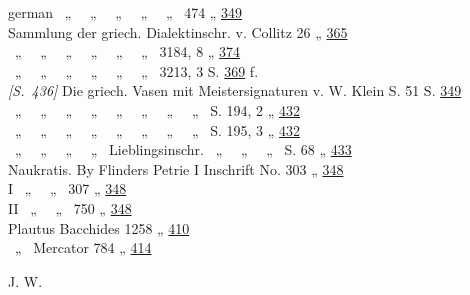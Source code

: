 \begin{otherlanguage*}{german}
\phantom{a}~„~ ~„~ ~„~ ~„~ ~„~ 474 \dotfill „ \hyperlink{p349}{349}\\
Sammlung der griech. Dialektinschr. v. Collitz 26 \dotfill „ \hyperlink{p365}{365}\\
\phantom{a}~„~ ~„~ ~„~ ~„~ ~„~ ~„~ 3184, 8 \dotfill „ \hyperlink{p374}{374}\\
\phantom{a}~„~ ~„~ ~„~ ~„~ ~„~ ~„~ 3213, 3 \dotfill S. \hyperlink{p369}{369} f.\\
\hypertarget{p436}{\emph{[S.~436]}}\label{p436} Die griech. Vasen mit Meistersignaturen v. W. Klein S. 51 \dotfill S. \hyperlink{p349}{349}\\
\phantom{a}~„~ ~„~ ~„~ ~„~ ~„~ ~„~ ~„~ ~„~ S. 194, 2 \dotfill „ \hyperlink{p432}{432}\\
\phantom{a}~„~ ~„~ ~„~ ~„~ ~„~ ~„~ ~„~ ~„~ S. 195, 3 \dotfill „ \hyperlink{p432}{432}\\
\phantom{a}~„~ ~„~ ~„~ ~„~ Lieblingsinschr. ~„~ ~„~ ~„~ S. 68 \dotfill „ \hyperlink{p433}{433}\\
Naukratis. By Flinders Petrie I Inschrift No. 303 \dotfill „ \hyperlink{p348}{348}\\
\phantom{Naukratis. By Flinders Petrie} I ~„~ ~„~ 307 \dotfill „ \hyperlink{p348}{348}\\
\phantom{Naukratis. By Flinders Petrie} II ~„~ ~„~ 750 \dotfill „ \hyperlink{p348}{348}\\
Plautus Bacchides 1258 \dotfill „ \hyperlink{p410}{410}\\
\phantom{a}~„~ Mercator 784 \dotfill „ \hyperlink{p414}{414}

\hfill J. W. \hspace{1ex}







\end{otherlanguage*}